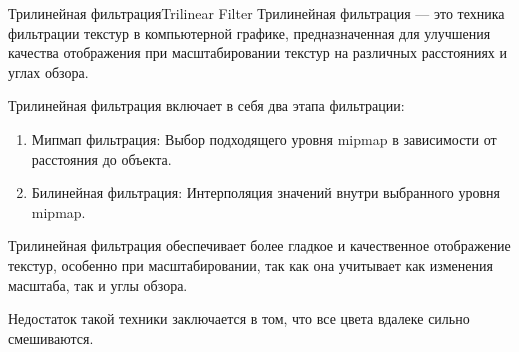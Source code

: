 \documentclass{beamer}
\begin{document}
	\begin{frame}{Трилинейная фильтрация}{Trilinear Filter}
		Трилинейная фильтрация --- это техника фильтрации текстур в компьютерной графике, предназначенная для улучшения качества отображения при масштабировании текстур на различных расстояниях и углах обзора.

		Трилинейная фильтрация включает в себя два этапа фильтрации:
		\begin{enumerate}
			\item 
			Мипмап фильтрация: Выбор подходящего уровня mipmap в зависимости от расстояния до объекта.
			\item
			Билинейная фильтрация: Интерполяция значений внутри выбранного уровня mipmap.
		\end{enumerate}


		Трилинейная фильтрация обеспечивает более гладкое и качественное отображение текстур, особенно при масштабировании, так как она учитывает как изменения масштаба, так и углы обзора.

		Недостаток такой техники заключается в том, что все цвета вдалеке сильно смешиваются.


	\end{frame}


	
	
\end{document}
